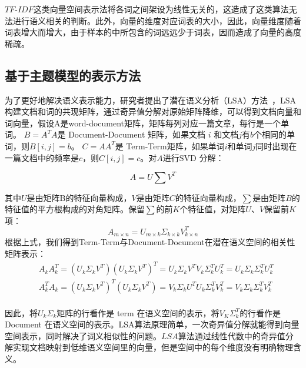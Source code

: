 $TF\textrm{-}IDF$这类向量空间表示法将各词之间架设为线性无关的，这造成了这类算法无法进行语义相关的判断。此外，向量的维度对应词表的大小，因此，向量维度随着词表增大而增大，由于样本的中所包含的词远远少于词表，因而造成了向量的高度稀疏。

\subsection{基于主题模型的表示方法}
为了更好地解决语义表示能力，研究者提出了潜在语义分析（LSA）方法~\cite{DeerwesterDLFH90}，LSA构建文档和词的共现矩阵，通过奇异值分解对原始矩阵降维，可以得到文档向量和词向量，假设A是word-document矩阵，矩阵每列对应一篇文章，每行是一个单词。 $B = A^{T}A$是 Document\textrm{-}Document 矩阵，如果文档 $i$ 和文档$j$有$b$个相同的单词，则$B[i,j]=b$。 $C = AA^{T}$是 Term\textrm{-}Term矩阵，如果单词$i$和单词$j$同时出现在一篇文档中的频率是$c$，则$C[i,j]=c$。对$A$进行SVD 分解：

\begin{equation}
    A=U\sum V^{T}
\end{equation}

其中$U$是由矩阵B的特征向量构成，$V$是由矩阵$C$的特征向量构成，$\sum$是由矩阵$B$的特征值的平方根构成的对角矩阵。保留$\sum$的前$K$个特征值，对矩阵$U$、$V$保留前$K$项：
\begin{equation}
    A_{m\times n}=U_{m\times k}{\Sigma}_{k\times k}V^{T}_{k\times n}
\end{equation}
根据上式，我们得到Term\textrm{-}Term与Document\textrm{-}Document在潜在语义空间的相关性矩阵表示：
\begin{equation}
    \begin{aligned}
        & A_{k}A^{T}_{k}=(U_{k}{\Sigma}_{k}V^{T})(U_{k}{\Sigma}_{k}V^{T})^{T}=U_{k}{\Sigma}_{k}V^{T}V_{k}\Sigma_{k}^{T}U_{k}^{T}=U_{k}\Sigma_{k}\Sigma_{k}^{T}U_{k}^{T} \\
        & A^{T}_{k}A_{k}=(U_{k}{\Sigma}_{k}V^{T})^{T}(U_{k}{\Sigma}_{k}V^{T})=V_{k}{\Sigma}_{k}U^{T}U_{k}\Sigma_{k}^{T}V_{k}^{T}=V_{k}\Sigma_{k}\Sigma_{k}^{T}V_{k}^{T} \\
    \end{aligned}
\end{equation}

因此，将$U_k\Sigma_{k}$矩阵的行看作是 term 在语义空间的表示，将$V_{K}\Sigma_{k}^{T}$的行看作是 Document 在语义空间的表示。LSA算法原理简单，一次奇异值分解就能得到向量空间表示，同时解决了词义相似性的问题。$LSA$算法通过线性代数中的奇异值分解实现文档映射到低维语义空间里的向量，但是空间中的每个维度没有明确物理含义。

